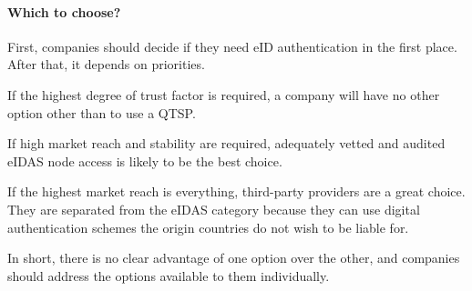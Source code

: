 \paragraph{Which to choose?} First, companies should decide if they need eID authentication in the first place. After that, it depends on priorities.

If the highest degree of trust factor is required, a company will have no other option other than to use a QTSP.

If high market reach and stability are required, adequately vetted and audited eIDAS node access is likely to be the best choice. 

If the highest market reach is everything, third-party providers are a great choice. They are separated from the eIDAS category because they can use digital authentication schemes the origin countries do not wish to be liable for.

In short, there is no clear advantage of one option over the other, and companies should address the options available to them individually.

